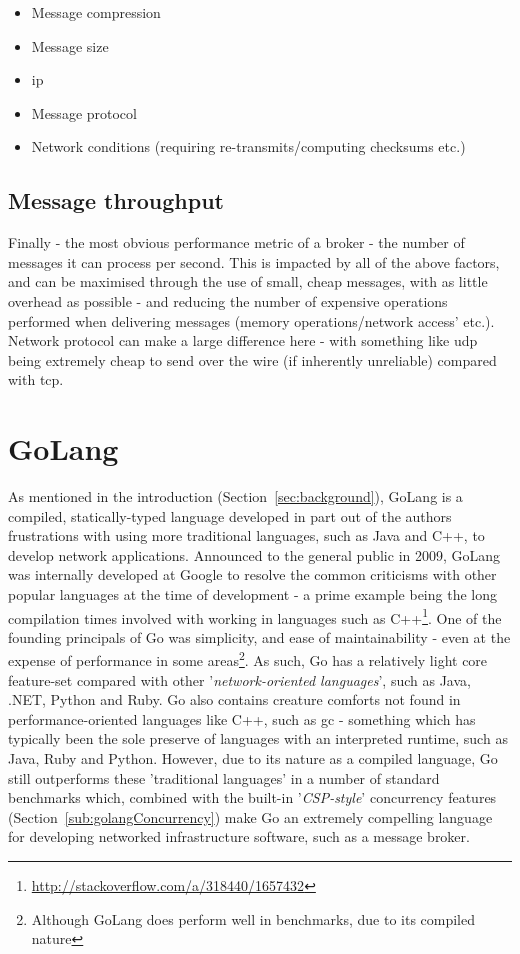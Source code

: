 \begin{itemize}
  \item Message compression
  \item Message size
  \item \gls{ip}
  \item Message protocol
  \item Network conditions (requiring re-transmits/computing checksums etc.)
\end{itemize}

\subsection{Message throughput}
\label{sub:Message throughput}

Finally - the most obvious performance metric of a broker - the number of
messages it can process per second. This is impacted by all of the above
factors, and can be maximised through the use of small, cheap messages, with as
little overhead as possible - and reducing the number of expensive operations
performed when delivering messages (memory operations/network access' etc.).
Network protocol can make a large difference here - with something like
\gls{udp} being extremely cheap to send over the wire (if inherently unreliable)
compared with \gls{tcp}.

\section{GoLang}
\label{sec:GoLang}

As mentioned in the introduction (Section~\ref{sec:background}), GoLang is a
compiled, statically-typed language developed in part out of the authors
frustrations with using more traditional languages, such as Java and C++, to
develop network applications\cite{kenThompsonInterview}. Announced to the
general public in 2009, GoLang was internally developed at Google to resolve the
common criticisms with other popular languages at the time of development - a
prime example being the long compilation times involved with working in
languages such as C++\footnote{\url{http://stackoverflow.com/a/318440/1657432}}.
One of the founding principals of Go was simplicity, and ease of
maintainability\cite{lessIsExponentiallyMore} - even at the expense of
performance in some areas\footnote{Although GoLang does perform well in
benchmarks, due to its compiled nature\cite{benchmarksGame}}. As such, Go has a
relatively light core feature-set compared with other '\emph{network-oriented
languages}', such as Java, .NET, Python and Ruby. Go also contains creature
comforts not found in performance-oriented languages like C++, such as \gls{gc} -
something which has typically been the sole preserve of languages with an
interpreted runtime, such as Java, Ruby and Python. However, due to its nature
as a compiled language, Go still outperforms these 'traditional languages' in a
number of standard benchmarks\cite{benchmarksGame} which, combined with the
built-in '\emph{CSP-style}'\cite{hoareCAR} concurrency features
(Section~\ref{sub:golangConcurrency}) make Go an extremely compelling language
for developing networked infrastructure software, such as a message broker.

